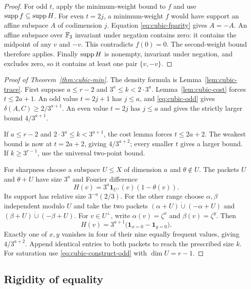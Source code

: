 \begin{proof}
For odd $t$, apply the minimum-weight bound to $f$ and use
$\operatorname{supp} f\subseteq\operatorname{supp} H$. For even $t=2j$, a minimum-weight $f$ would
have support an affine subspace $A$ of codimension $j$.
Equation \eqref{eq:cubic-fparity} gives $A=-A$. An affine subspace over
$\mathbb F_3$ invariant under negation contains zero: it contains the midpoint
of any $v$ and $-v$. This contradicts $f(0)=0$. The second-weight bound
therefore applies. Finally $\operatorname{supp} H$ is nonempty, invariant under
negation, and excludes zero, so it contains at least one pair
$\{v,-v\}$.
\end{proof}

\begin{proof}[Proof of Theorem~\ref{thm:cubic-min}]
The density formula is Lemma~\ref{lem:cubic-trace}. First suppose
$a\leq r-2$ and $3^a\leq k<2\cdot3^a$. Lemma~\ref{lem:cubic-cost}
forces $t\leq2a+1$. An odd value $t=2j+1$ has $j\leq a$, and
\eqref{eq:cubic-odd} gives $\delta(A,C)\geq2/3^{a+1}$.
An even value $t=2j$ has $j\leq a$ and gives the strictly larger bound
$4/3^{a+1}$.

If $a\leq r-2$ and $2\cdot3^a\leq k<3^{a+1}$, the cost lemma forces
$t\leq2a+2$. The weakest bound is now at $t=2a+2$, giving
$4/3^{a+2}$; every smaller $t$ gives a larger bound. If
$k\geq3^{r-1}$, use the universal two-point bound.

For sharpness choose a subspace $U\leq X$ of dimension $a$ and
$\theta\notin U$. The packets $U$ and $\theta+U$ have size $3^a$ and
Fourier difference
\begin{equation}\label{eq:cubic-construct-odd}
 H(v)=3^a\mathbf1_{U^\perp}(v)(1-\theta(v)).
\end{equation}
Its support has relative size $3^{-a}(2/3)$.
For the other range choose $\alpha,\beta$ independent modulo $U$ and
take the two packets
$(\alpha+U)\mathbin{\dot\cup}(-\alpha+U)$ and
$(\beta+U)\mathbin{\dot\cup}(-\beta+U)$.
For $v\in U^\perp$, write $\alpha(v)=\zeta^x$ and
$\beta(v)=\zeta^y$. Then
\begin{equation}\label{eq:cubic-construct-even}
 H(v)=3^{a+1}\bigl(\mathbf1_{x=0}-\mathbf1_{y=0}\bigr).
\end{equation}
Exactly one of $x,y$ vanishes in four of their nine equally frequent
values, giving $4/3^{a+2}$. Append identical entries to both packets to
reach the prescribed size $k$. For saturation use
\eqref{eq:cubic-construct-odd} with $\dim U=r-1$.
\end{proof}

\subsection{Rigidity of equality}

